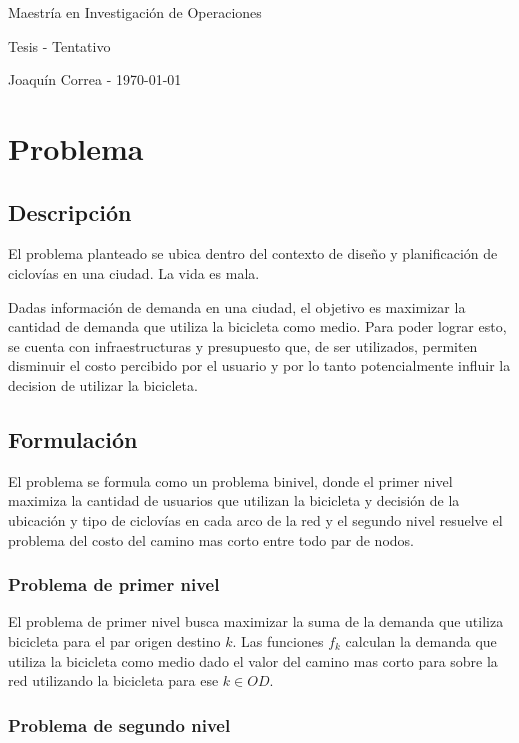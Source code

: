 \documentclass{article}
\begin{document}
  \begin{center}
    {\sc \large Maestría en Investigación de Operaciones}
    
    {\sc \large Tesis - Tentativo}
    \linebreak

    {\rm Joaquín Correa - \today}
  \end{center}

  \section*{Problema}

  \subsection*{Descripción}

  El problema planteado se ubica dentro del contexto de diseño y planificación de ciclovías en una ciudad. La vida es mala.

  Dadas información de demanda en una ciudad, el objetivo es maximizar la cantidad de demanda que utiliza la bicicleta como medio. Para poder lograr esto, se cuenta con infraestructuras y presupuesto que, de ser utilizados, permiten disminuir el costo percibido por el usuario y por lo tanto potencialmente influir la decision de utilizar la bicicleta.

  \subsection*{Formulación}

  El problema se formula como un problema binivel, donde el primer nivel maximiza la cantidad de usuarios que utilizan la bicicleta y decisión de la ubicación y tipo de ciclovías en cada arco de la red y el segundo nivel resuelve el problema del costo del camino mas corto entre todo par de nodos.

  \subsubsection*{Problema de primer nivel}

  El problema de primer nivel busca maximizar la suma de la demanda que utiliza bicicleta para el par origen destino $k$. Las funciones $f_k$ calculan la demanda que utiliza la bicicleta como medio dado el valor del camino mas corto para sobre la red utilizando la bicicleta para ese $k \in OD$.

  \subsubsection*{Problema de segundo nivel}
\end{document}
